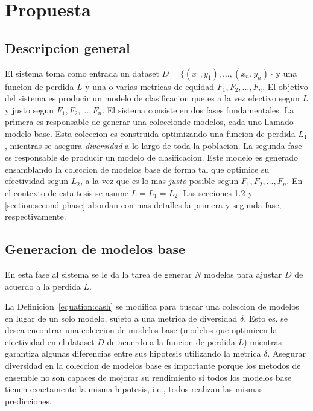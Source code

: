 \chapter{Propuesta}\label{chapter:proposal}

\section{Descripcion general}\label{section:overview}

El sistema toma como entrada un dataset $D = \{(x_1, y_1), \dots , (x_n, y_n)\}$ y una funcion de perdida $L$ y una o varias metricas de equidad $F_1, F_2, \dots, F_n$. El objetivo del sistema es producir un modelo de clasificacion que es a la vez efectivo segun $L$ y justo segun $F_1, F_2, \dots, F_n$. El sistema consiste en dos fases fundamentales. La primera es responsable de generar una coleccionde modelos, cada uno llamado modelo base. Esta coleccion es construida optimizando una funcion de perdida $L_1$, mientras se asegura \emph{diversidad} a lo largo de toda la poblacion. La segunda fase es responsable de producir un modelo de clasificacion. Este modelo es generado ensamblando la coleccion de modelos base de forma tal que optimice su efectividad segun $L_2$, a la vez que es lo mas \emph{justo} posible segun $F_1, F_2, \dots, F_n$. En el contexto de esta tesis se asume $L = L_1 = L_2$. Las secciones \ref{section:first-phase} y \ref{section:second-phase} abordan con mas detalles la primera y segunda fase, respectivamente.


\section{Generacion de modelos base}\label{section:first-phase}


En esta fase al sistema se le da la tarea de generar $N$ modelos para ajustar $D$ de acuerdo a la perdida $L$.

La Definicion~\ref{equation:cash} se modifica para buscar una coleccion de modelos en lugar de un solo modelo, sujeto a una metrica de diversidad $\delta$. Esto es, se desea encontrar una coleccion de modelos base (modelos que optimicen la efectividad en el dataset $D$ de acuerdo a la funcion de perdida $L$) mientras garantiza algunas diferencias entre sus hipotesis utilizando la metrica $\delta$. Asegurar diversidad en la coleccion de modelos base es importante porque los metodos de ensemble no son capaces de mojorar su rendimiento si todos los modelos base tienen exactamente la misma hipotesis, i.e., todos realizan las mismas predicciones.

